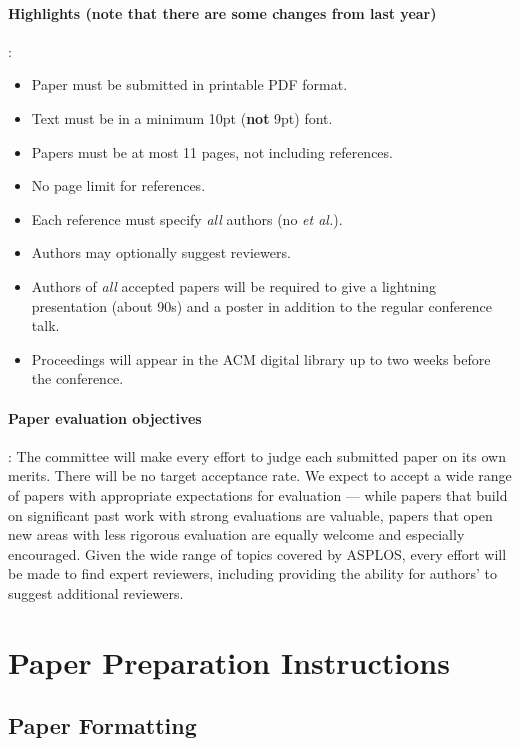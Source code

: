 \documentclass[pageno]{jpaper}
\begin{document}
\paragraph{Highlights ({\bf note that there are some changes from last year})}: 
\begin{itemize} 
\item Paper must be submitted in printable PDF format.
\item Text must be in a minimum 10pt ({\bf not} 9pt) font.
\item Papers must be at most 11 pages, not including references. 
\item No page limit for references. 
\item Each reference must specify {\em all} authors (no {\em et al.}). 
\item Authors may optionally suggest reviewers. 
\item Authors of {\em all} accepted papers will be required to give a
lightning presentation (about 90s) and a poster in addition to the regular
conference talk.
\item Proceedings will appear in the ACM digital library up to two weeks
before the conference.
\end{itemize} 

\paragraph{Paper evaluation objectives}: 
The committee will make every effort to judge each submitted paper on 
its own merits. There will be no target acceptance rate. 
We expect to accept a wide range of papers with appropriate expectations 
for evaluation --- while papers that build on significant past work 
with strong evaluations are valuable, papers that open new areas with 
less rigorous evaluation are equally welcome and especially encouraged. 
Given the wide range of topics covered by ASPLOS, every effort will be 
made to find expert reviewers, including providing the ability for authors' 
to suggest additional reviewers. 

\section{Paper Preparation Instructions}

\subsection{Paper Formatting}
\end{document}
